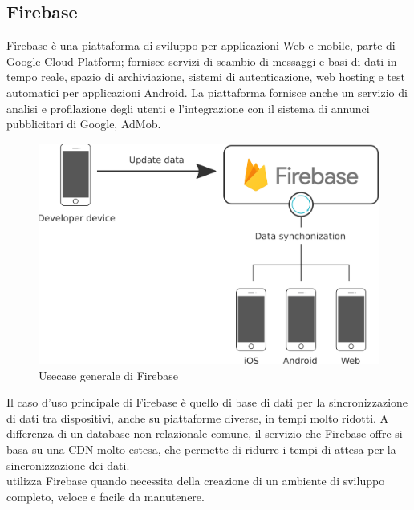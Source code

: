    \subsection{Firebase}
   Firebase è una piattaforma di sviluppo per applicazioni Web e mobile, parte di Google Cloud Platform; fornisce servizi di scambio di messaggi e basi di dati in tempo reale, spazio di archiviazione, sistemi di autenticazione, web hosting e test automatici per applicazioni Android. La piattaforma fornisce anche un servizio di analisi e profilazione degli utenti e l'integrazione con il sistema di annunci pubblicitari di Google, AdMob.
   \begin{figure}[H]
      \begin{center}
         \includegraphics[width=14cm,keepaspectratio]{immagini/firebase-usecase}
      \end{center}
      \caption{Usecase generale di Firebase}
   \end{figure}
   Il caso d'uso principale di Firebase è quello di base di dati per la sincronizzazione di dati tra dispositivi, anche su piattaforme diverse, in tempi molto ridotti. A differenza di un database non relazionale comune, il servizio che Firebase offre si basa su una CDN molto estesa, che permette di ridurre i tempi di attesa per la sincronizzazione dei dati.
   \\
   \nomeAzienda{} utilizza Firebase quando necessita della creazione di un ambiente di sviluppo completo, veloce e facile da manutenere.


